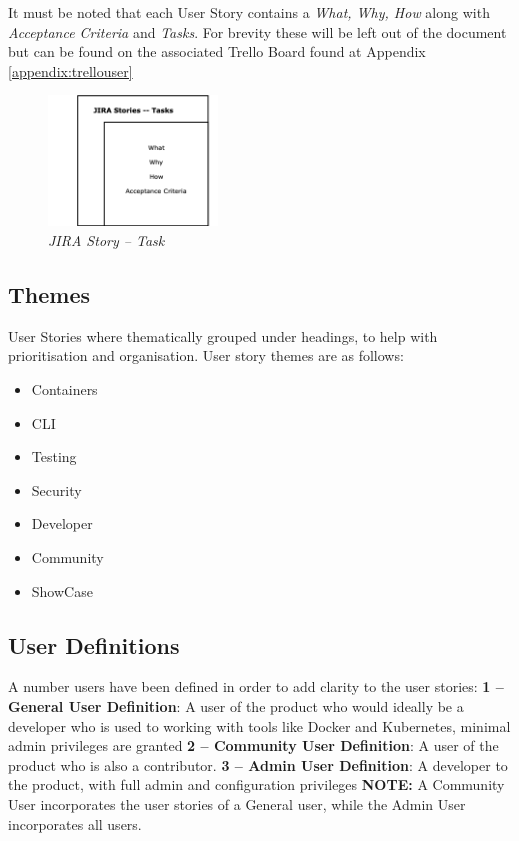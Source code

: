 It must be noted that each User Story contains a \textit{What, Why, How} along with \textit{Acceptance Criteria} and \textit{Tasks}. For brevity these will be left out of the document but can be found on the associated Trello Board found at Appendix \ref{appendix:trellouser}

\begin{figure}[!ht]
\centering
\includegraphics*[width=0.4\textwidth]{images/stories1.png}
\caption{\em JIRA Story -- Task}
\label{img:showcase-arch}
\end{figure}

\clearpage
\subsection{Themes}
User Stories where thematically grouped under headings, to help with prioritisation and organisation. User story themes are as follows:
\begin{itemize}
    \item Containers
    \item CLI
    \item Testing
    \item Security
    \item Developer
    \item Community
    \item ShowCase
\end{itemize}

\subsection{User Definitions}
A number users have been defined in order to add clarity to the user stories:
\newline
\textbf{1 -- General User Definition}: A user of the product who would ideally be a developer who is used to working with tools like \gls{Docker} and \gls{Kubernetes}, minimal admin privileges are granted
\newline
\textbf{2 -- Community User Definition}: A user of the product who is also a contributor.
\newline
\textbf{3 -- Admin User Definition}: A developer to the product, with full admin and configuration privileges
\newline \textbf{NOTE:} A Community User incorporates the user stories of a General user, while the Admin User incorporates all users.



